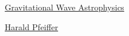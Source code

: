 \documentclass[11pt]{article}
\begin{document}
	\kaishu 
	\setcounter{section}{0}
	\begin{center}
		{\LARGE  \href{https://git.aei.mpg.de/hpfeiffer/GWAstro2022}{Gravitational Wave Astrophysics}}
		
		
		{\large \href{https://www.aei.mpg.de/person/54205/2784}{Harald Pfeiffer}}
	\end{center}
\setcounter{page}{1}

\end{document}

